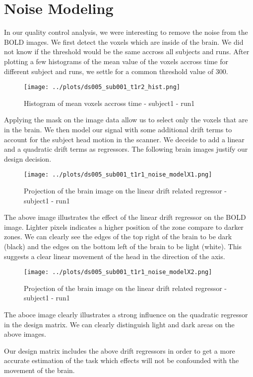 \section{Noise Modeling}
\noindent
In our quality control analysis, we were interesting to remove the noise
from the BOLD images. 
We first detect the voxels which are inside of the brain. We did not know
if the threshold would be the same accross all subjects and runs. After 
plotting a few histograms of the mean value of the voxels accross time 
for different subject and runs, we settle for a common threshold value of
300.
\begin{figure}[H]
    \centering
        \texttt{[image: ../plots/ds005\_sub001\_t1r2\_hist.png]}
            \caption{Histogram of mean voxels accross time - subject1 - run1 }
\end{figure}

Applying the mask on the image data allow us to select only the voxels that
are in the brain. 
We then model our signal with some additional drift terms to account for
the subject head motion in the scanner. We deceide to add a linear and a 
quadratic drift terms as regressors. The following brain images justify
our design decision.

\begin{figure}[H]
    \centering
        \texttt{[image: ../plots/ds005\_sub001\_t1r1\_noise\_modelX1.png]}
             \caption{Projection of the brain image on the linear drift related regressor - subject1 - run1}
\end{figure}

The above image illustrates the effect of the linear drift regressor on the BOLD image.
Lighter pixels indicates a higher position of the zone compare
to darker zones. We can clearly see the edges of the top right of the brain to be
dark (black) and the edges on the bottom left of the brain to be light (white). 
This suggests a clear linear movement of the head in the direction of the axis. 

\begin{figure}[H]
    \centering
        \texttt{[image: ../plots/ds005\_sub001\_t1r1\_noise\_modelX2.png]}
            \caption{Projection of the brain image on the linear drift related regressor - subject1 - run1}
\end{figure}

The aboce image clearly illustrates a strong influence on the quadratic regressor in
the design matrix. We can clearly distinguish light and dark areas on the above images.

Our design matrix includes the above drift regressors in order to get a more accurate
estimation of the task which effects will not be confounded with the movement of the
brain.

